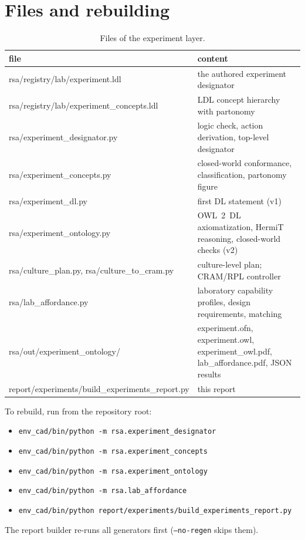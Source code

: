 \documentclass[10pt,a4paper]{article}
\begin{document}
\section{Files and rebuilding}\label{app:files}
\begin{table}[tbp]\centering\footnotesize
\caption{Files of the experiment layer.}\label{tab:files}
\begin{tabularx}{\linewidth}{@{}p{6.6cm}X@{}}\toprule file & content \\ \midrule
rsa/registry/lab/experiment.ldl & the authored experiment designator \\
rsa/registry/lab/experiment\_\allowbreak{}concepts.ldl & LDL concept hierarchy with partonomy \\
rsa/experiment\_\allowbreak{}designator.py & logic check, action derivation, top-level designator \\
rsa/experiment\_\allowbreak{}concepts.py & closed-world conformance, classification, partonomy figure \\
rsa/experiment\_\allowbreak{}dl.py & first DL statement (v1) \\
rsa/experiment\_\allowbreak{}ontology.py & OWL~2~DL axiomatization, HermiT reasoning, closed-world checks (v2) \\
rsa/culture\_\allowbreak{}plan.py, rsa/culture\_\allowbreak{}to\_\allowbreak{}cram.py & culture-level plan; CRAM/RPL controller \\
rsa/lab\_\allowbreak{}affordance.py & laboratory capability profiles, design requirements, matching \\
rsa/out/experiment\_\allowbreak{}ontology/ & experiment.ofn, experiment.owl, experiment\_\allowbreak{}owl.pdf, lab\_\allowbreak{}affordance.pdf, JSON results \\
report/experiments/build\_\allowbreak{}experiments\_\allowbreak{}report.py & this report \\
\bottomrule\end{tabularx}\end{table}


To rebuild, run from the repository root:
\begin{itemize}
\item \texttt{env\_\allowbreak{}cad/bin/python -m rsa.experiment\_\allowbreak{}designator}
\item \texttt{env\_\allowbreak{}cad/bin/python -m rsa.experiment\_\allowbreak{}concepts}
\item \texttt{env\_\allowbreak{}cad/bin/python -m rsa.experiment\_\allowbreak{}ontology}
\item \texttt{env\_\allowbreak{}cad/bin/python -m rsa.lab\_\allowbreak{}affordance}
\item \texttt{env\_\allowbreak{}cad/bin/python report/experiments/build\_\allowbreak{}experiments\_\allowbreak{}report.py}
\end{itemize}
The report builder re-runs all generators first (\texttt{--no-regen} skips them).
\end{document}
